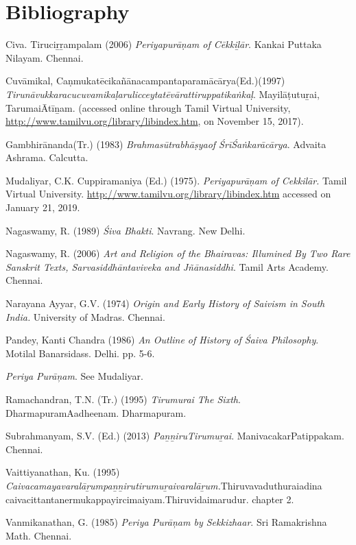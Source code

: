 \section*{Bibliography}

\begin{thebibliography}{99}
 Civa. Tiruciṟṟampalam (2006) \textit{Periyapurāṇam of Cēkkiḻār}. Kankai Puttaka Nilayam. Chennai.

  Cuvāmikal, Caṇmukatēcikañānacampantaparamācārya(Ed.)(1997) \textit{Tirunāvukkaracucuvamikaḷarulicceytatēvārattiruppatikaṅkaḷ}. Mayilāṭutuṟai, TarumaiĀtīṉam. (accessed online through Tamil Virtual University, \url{http://www.tamilvu.org/library/libindex.htm}, on November 15, 2017).

  Gambhirānanda(Tr.) (1983) \textit{Brahmasūtrabhāṣyaof ŚrīŚaṅkarācārya}. Advaita Ashrama. Calcutta.

  Mudaliyar, C.K. Cuppiramaniya (Ed.) (1975). \textit{Periyapurāṇam of Cekkilār. }Tamil Virtual University. \url{ http://www.tamilvu.org/library/libindex.htm} accessed on January 21, 2019.

  Nagaswamy, R. (1989) \textit{Śiva Bhakti}. Navrang. New Delhi.

  Nagaswamy, R. (2006) \textit{Art and Religion of the Bhairavas: Illumined By Two Rare Sanskrit Texts, Sarvasiddhāntaviveka and Jñānasiddhi}. Tamil Arts Academy. Chennai.

  Narayana Ayyar, G.V. (1974) \textit{Origin and Early History of Saivism in South India.} University of Madras. Chennai.

  Pandey, Kanti Chandra (1986) \textit{An Outline of History of Śaiva Philosophy}. Motilal Banarsidass. Delhi. pp. 5-6.

  \textit{Periya Purāņam}. See Mudaliyar.

  Ramachandran, T.N. (Tr.) (1995) \textit{Tirumurai The Sixth}. DharmapuramAadheenam. Dharmapuram.

  Subrahmanyam, S.V. (Ed.) (2013) \textit{PaṉṉiruTirumuṟai}. ManivacakarPatippakam. Chennai.

  Vaittiyanathan, Ku. (1995) \textit{Caivacamayavaralāṟumpaṉṉirutirumuṟaivaralāṟum.}Thiruvavaduthuraiadina caivacittantanermukappayircimaiyam.Thiruvidaimarudur. chapter 2.

  Vanmikanathan, G. (1985) \textit{Periya Purāņam by Sekkizhaar}. Sri Ramakrishna Math. Chennai.

 \end{thebibliography}


